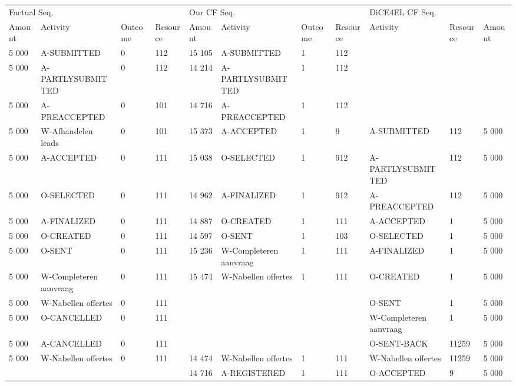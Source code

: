 \begin{tabular}{lllllllllll}
\toprule
\multicolumn{4}{l}{Factual Seq.} & \multicolumn{4}{l}{Our CF Seq.} & \multicolumn{3}{l}{DiCE4EL CF Seq.} \\
Amount & Activity & Outcome & Resource & Amount & Activity & Outcome & Resource & Activity & Resource & Amount \\
\midrule
5 000 & A-SUBMITTED & 0 & 112 & 15 105 & A-SUBMITTED & 1 & 112 &  &  &  \\
5 000 & A-PARTLYSUBMITTED & 0 & 112 & 14 214 & A-PARTLYSUBMITTED & 1 & 112 &  &  &  \\
5 000 & A-PREACCEPTED & 0 & 101 & 14 716 & A-PREACCEPTED & 1 & 112 &  &  &  \\
5 000 & W-Afhandelen leads & 0 & 101 & 15 373 & A-ACCEPTED & 1 & 9 & A-SUBMITTED & 112 & 5 000 \\
5 000 & A-ACCEPTED & 0 & 111 & 15 038 & O-SELECTED & 1 & 912 & A-PARTLYSUBMITTED & 112 & 5 000 \\
5 000 & O-SELECTED & 0 & 111 & 14 962 & A-FINALIZED & 1 & 912 & A-PREACCEPTED & 112 & 5 000 \\
5 000 & A-FINALIZED & 0 & 111 & 14 887 & O-CREATED & 1 & 111 & A-ACCEPTED & 1 & 5 000 \\
5 000 & O-CREATED & 0 & 111 & 14 597 & O-SENT & 1 & 103 & O-SELECTED & 1 & 5 000 \\
5 000 & O-SENT & 0 & 111 & 15 236 & W-Completeren aanvraag & 1 & 111 & A-FINALIZED & 1 & 5 000 \\
5 000 & W-Completeren aanvraag & 0 & 111 & 15 474 & W-Nabellen offertes & 1 & 111 & O-CREATED & 1 & 5 000 \\
5 000 & W-Nabellen offertes & 0 & 111 &  &  &  &  & O-SENT & 1 & 5 000 \\
5 000 & O-CANCELLED & 0 & 111 &  &  &  &  & W-Completeren aanvraag & 1 & 5 000 \\
5 000 & A-CANCELLED & 0 & 111 &  &  &  &  & O-SENT-BACK & 11259 & 5 000 \\
5 000 & W-Nabellen offertes & 0 & 111 & 14 474 & W-Nabellen offertes & 1 & 111 & W-Nabellen offertes & 11259 & 5 000 \\
 &  &  &  & 14 716 & A-REGISTERED & 1 & 111 & O-ACCEPTED & 9 & 5 000 \\
\bottomrule
\end{tabular}
